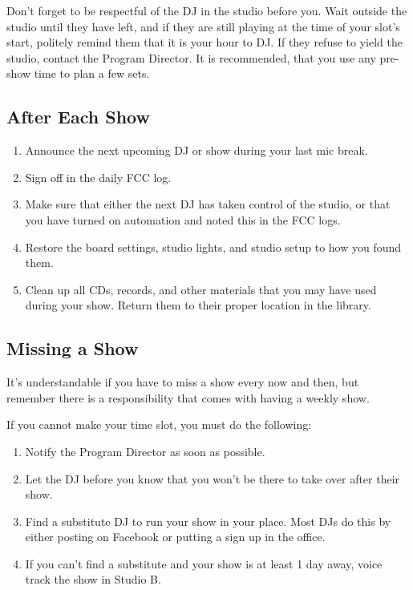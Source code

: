 \documentclass{witrman}
\begin{document}
Don't forget to be respectful of the DJ in the studio before you.  Wait outside
the studio until they have left, and if they are still playing at the time of
your slot's start, politely remind them that it is your hour to DJ\@.  If they
refuse to yield the studio, contact the Program Director.  It is recommended,
that you use any pre-show time to plan a few sets.

\subsection{After Each Show}
\begin{enumerate}
    \item Announce the next upcoming DJ or show during your last mic break.
    \item Sign off in the daily FCC log.
    \item Make sure that either the next DJ has taken control of the studio, or
        that you have turned on automation and noted this in the FCC logs.
    \item Restore the board settings, studio lights, and studio setup to how you
        found them.
    \item Clean up all CDs, records, and other materials that you may have used
        during your show.  Return them to their proper location in the library.
\end{enumerate}

\subsection{Missing a Show}

It's understandable if you have to miss a show every now and then, but remember
there is a responsibility that comes with having a weekly show.

If you cannot make your time slot, you must do the following:

\begin{enumerate}
    \item Notify the Program Director as soon as possible.
    \item Let the DJ before you know that you won't be there to take over after
        their show.
    \item Find a substitute DJ to run your show in your place.  Most DJs do
        this by either posting on Facebook or putting a sign up in the office.
    \item If you can't find a substitute and your show is at least 1 day away,
        voice track the show in Studio B.
\end{enumerate}
\end{document}
